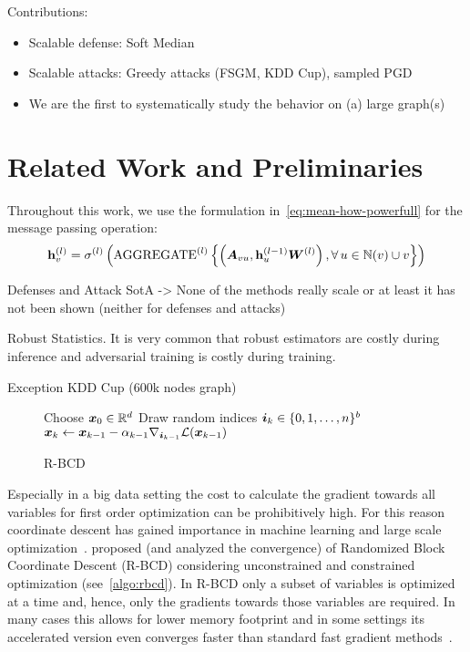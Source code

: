 \documentclass{article} %
\newcommand{\adj}{\mA}
\newcommand{\weight}{\mW}
\newcommand{\neighbors}{\sN}
\begin{document}
Contributions:
\begin{itemize}
   \item Scalable defense: Soft Median
   \item Scalable attacks: Greedy attacks (FSGM, KDD Cup), sampled PGD
   \item We are the first to systematically study the behavior on (a) large graph(s)
\end{itemize}

\clearpage
\section{Related Work and Preliminaries} %

Throughout this work, we use the formulation in~\autoref{eq:mean-how-powerfull} for the message passing operation:
\begin{equation}\label{eq:mean-how-powerfull}
  \mathbf{h}^{(l)}_v = \sigma^{(l)} \left( \text{AGGREGATE}^{(l)} \left \{ \left( \adj_{vu}, \mathbf{h}^{(l-1)}_u \weight^{(l)} \right), \forall \, u\in \neighbors(v) \cup v \right \} \right)
\end{equation}

Defenses and Attack SotA
-> None of the methods really scale or at least it has not been shown (neither for defenses and attacks)

Robust Statistics. It is very common that robust estimators are costly during inference and adversarial training is costly during training.

Exception KDD Cup (600k nodes graph)

\begin{wrapfigure}[8]{L}{0.5\textwidth}
  \vspace{-22pt}
  \begin{minipage}{0.5\textwidth}
    \begin{algorithm}[H]
	\caption{R-BCD}
	\label{algo:rbcd}
	\begin{algorithmic}
		\STATE Choose \({\bm{x}}_0 \in \mathbb{R}^d\)
		\STATE Draw random indices \({\bm{i}}_k \in \{0, 1, \dots, n\}^b\)
		\STATE \({\bm{x}}_{k} \leftarrow {\bm{x}}_{k-1} - \alpha_{k-1} \nabla_{{\bm{i}}_{k-1}} \mathcal{L}({\bm{x}}_{k-1})\)
		\ENDFOR
	\end{algorithmic}
    \end{algorithm}
 \end{minipage}
\end{wrapfigure}

Especially in a big data setting the cost to calculate the gradient towards all variables for first order optimization can be prohibitively high. For this reason coordinate descent has gained importance in machine learning and large scale optimization~\citep{Wright2015}. \citet{Nesterov2012} proposed (and analyzed the convergence) of Randomized Block Coordinate Descent (R-BCD) considering unconstrained and constrained optimization (see~\autoref{algo:rbcd}). In R-BCD only a subset of variables is optimized at a time and, hence, only the gradients towards those variables are required. In many cases this allows for lower memory footprint and in some settings its accelerated version even converges faster than standard fast gradient methods~\citep{Nesterov2017}.
\end{document}

